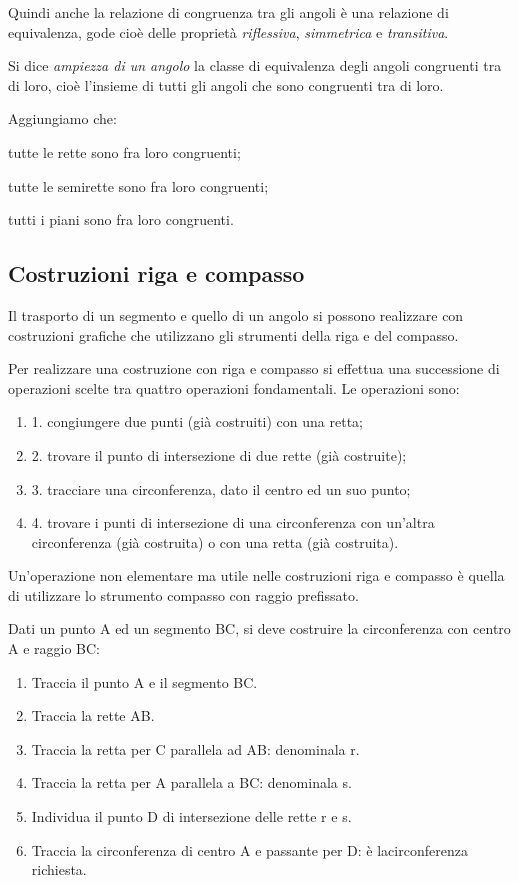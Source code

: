 Quindi anche la relazione di congruenza tra gli angoli è una 
relazione di equivalenza, gode cioè delle proprietà 
\emph{riflessiva}, \emph{simmetrica} e \emph{transitiva}.

\begin{definizione}
Si dice \emph{ampiezza di un angolo} la classe di equivalenza degli 
angoli congruenti tra di loro, cioè l'insieme di tutti gli angoli che 
sono congruenti tra di loro.
\end{definizione}

Aggiungiamo che:
\begin{itemize*}
\item tutte le rette sono fra loro congruenti;
\item tutte le semirette sono fra loro congruenti;
\item tutti i piani sono fra loro congruenti.
\end{itemize*}

\subsection{Costruzioni riga e compasso}

Il trasporto di un segmento e quello di un angolo si possono realizzare con costruzioni grafiche che utilizzano gli strumenti della riga e del compasso.

Per realizzare una costruzione con riga e compasso si effettua una successione
di operazioni scelte tra quattro operazioni fondamentali. 
Le operazioni sono:
\begin{enumerate} [nosep]
	\item 
1. congiungere due punti (già costruiti) con una retta;
	\item 
2. trovare il punto di intersezione di due rette (già costruite);
	\item 
3. tracciare una circonferenza, dato il centro ed un suo punto;
	\item 
4. trovare i punti di intersezione di una circonferenza con un’altra 
circonferenza (già costruita) o con una retta (già costruita).
	\end{enumerate}

Un'operazione non elementare ma utile nelle costruzioni riga e compasso è 
quella di utilizzare lo strumento compasso con raggio prefissato.
\begin{procedura}
	Dati un punto A ed un segmento BC, si deve costruire la circonferenza con centro A e raggio BC:
	\begin{enumerate} [nosep]
		\item 
		Traccia il punto A e il segmento BC.
		\item 
		Traccia la rette AB.
		\item 
		Traccia la retta per C parallela ad AB: denominala r.
		\item 
		Traccia la retta per A parallela a BC: denominala s.
		\item 
		Individua il punto D di intersezione delle rette r e s.
		\item 
		Traccia la circonferenza di centro A e passante per D: è lacirconferenza richiesta.		
	\end{enumerate}
\end{procedura}

